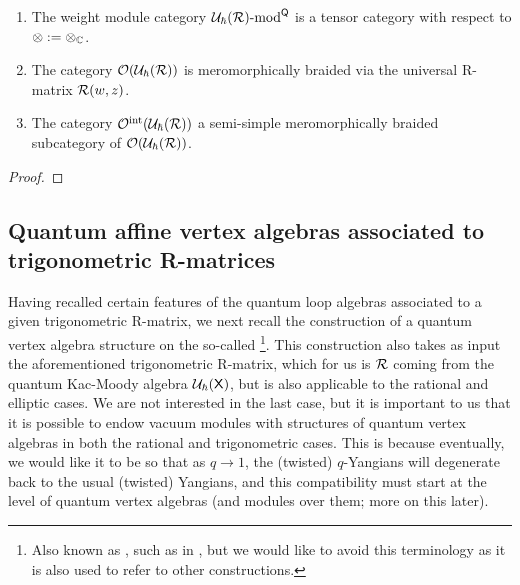         \begin{definition} \label{def: category_O_loop_QUEs}
            
        \end{definition}
        \begin{lemma} \label{lemma: tensor_structure_and_semi_simplicity_of_category_O}
            \begin{enumerate}
                \item The weight module category $\mathcal{U}_{\hbar}(\mathcal{R})\text{-}\mathrm{mod}^{\mathsf{Q}}$ is a tensor category with respect to $\tensor := \tensor_{\bbC}$.
                \item The category $\mathcal{O}( \mathcal{U}_{\hbar}(\mathcal{R}) )$ is meromorphically braided via the universal R-matrix $\mathcal{R}(w, z)$.
                \item The category $\mathcal{O}^{\mathrm{int}}( \mathcal{U}_{\hbar}(\mathcal{R}) )$ a semi-simple meromorphically braided subcategory of $\mathcal{O}( \mathcal{U}_{\hbar}(\mathcal{R}) )$.
            \end{enumerate}
        \end{lemma}
            \begin{proof}
                
            \end{proof}

    \subsection{Quantum affine vertex algebras associated to trigonometric R-matrices}
        Having recalled certain features of the quantum loop algebras associated to a given trigonometric R-matrix, we next recall the construction of a quantum vertex algebra structure on the so-called \footnote{Also known as , such as in \cite{etingof_kazhdan_quantisation_5}, but we would like to avoid this terminology as it is also used to refer to other constructions.}. This construction also takes as input the aforementioned trigonometric R-matrix, which for us is $\mathcal{R}$ coming from the quantum Kac-Moody algebra $\mathcal{U}_{\hbar}(\mathsf{X})$, but is also applicable to the rational and elliptic cases. We are not interested in the last case, but it is important to us that it is possible to endow vacuum modules with structures of quantum vertex algebras in both the rational and trigonometric cases. This is because eventually, we would like it to be so that as $q \to 1$, the (twisted) $q$-Yangians will degenerate back to the usual (twisted) Yangians, and this compatibility must start at the level of quantum vertex algebras (and modules over them; more on this later).

